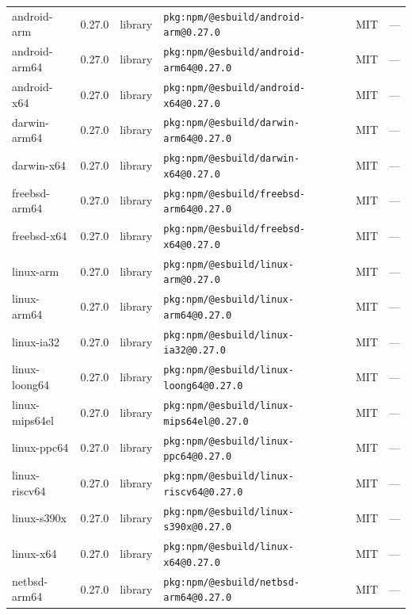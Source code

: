 \documentclass[11pt,a4paper]{article}
\begin{document}
\begin{longtable}{|p{4cm}|p{2cm}|p{1.6cm}|p{5cm}|p{1.5cm}|p{3.5cm}|}
\raggedright android-arm & 0.27.0 & library & \small\texttt{pkg:npm/@esbuild/android-arm@0.27.0} & MIT & \small — \\
\raggedright android-arm64 & 0.27.0 & library & \small\texttt{pkg:npm/@esbuild/android-arm64@0.27.0} & MIT & \small — \\
\raggedright android-x64 & 0.27.0 & library & \small\texttt{pkg:npm/@esbuild/android-x64@0.27.0} & MIT & \small — \\
\raggedright darwin-arm64 & 0.27.0 & library & \small\texttt{pkg:npm/@esbuild/darwin-arm64@0.27.0} & MIT & \small — \\
\raggedright darwin-x64 & 0.27.0 & library & \small\texttt{pkg:npm/@esbuild/darwin-x64@0.27.0} & MIT & \small — \\
\raggedright freebsd-arm64 & 0.27.0 & library & \small\texttt{pkg:npm/@esbuild/freebsd-arm64@0.27.0} & MIT & \small — \\
\raggedright freebsd-x64 & 0.27.0 & library & \small\texttt{pkg:npm/@esbuild/freebsd-x64@0.27.0} & MIT & \small — \\
\raggedright linux-arm & 0.27.0 & library & \small\texttt{pkg:npm/@esbuild/linux-arm@0.27.0} & MIT & \small — \\
\raggedright linux-arm64 & 0.27.0 & library & \small\texttt{pkg:npm/@esbuild/linux-arm64@0.27.0} & MIT & \small — \\
\raggedright linux-ia32 & 0.27.0 & library & \small\texttt{pkg:npm/@esbuild/linux-ia32@0.27.0} & MIT & \small — \\
\raggedright linux-loong64 & 0.27.0 & library & \small\texttt{pkg:npm/@esbuild/linux-loong64@0.27.0} & MIT & \small — \\
\raggedright linux-mips64el & 0.27.0 & library & \small\texttt{pkg:npm/@esbuild/linux-mips64el@0.27.0} & MIT & \small — \\
\raggedright linux-ppc64 & 0.27.0 & library & \small\texttt{pkg:npm/@esbuild/linux-ppc64@0.27.0} & MIT & \small — \\
\raggedright linux-riscv64 & 0.27.0 & library & \small\texttt{pkg:npm/@esbuild/linux-riscv64@0.27.0} & MIT & \small — \\
\raggedright linux-s390x & 0.27.0 & library & \small\texttt{pkg:npm/@esbuild/linux-s390x@0.27.0} & MIT & \small — \\
\raggedright linux-x64 & 0.27.0 & library & \small\texttt{pkg:npm/@esbuild/linux-x64@0.27.0} & MIT & \small — \\
\raggedright netbsd-arm64 & 0.27.0 & library & \small\texttt{pkg:npm/@esbuild/netbsd-arm64@0.27.0} & MIT & \small — \\

\end{longtable}
\end{document}
